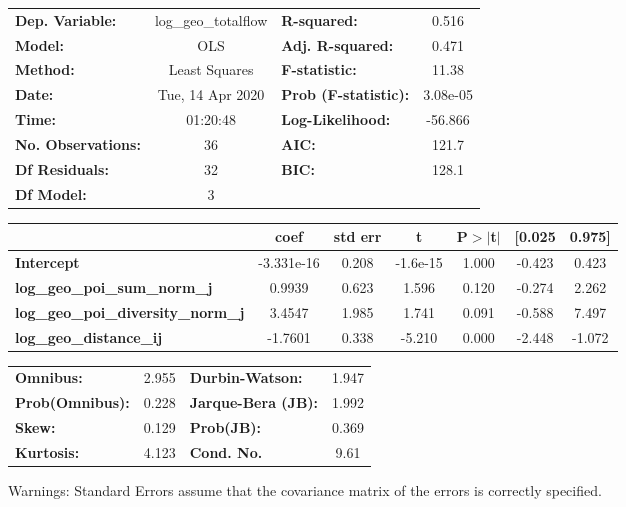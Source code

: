 \begin{center}
\begin{tabular}{lclc}
\toprule
\textbf{Dep. Variable:}                    & log\_geo\_totalflow & \textbf{  R-squared:         } &     0.516   \\
\textbf{Model:}                            &         OLS         & \textbf{  Adj. R-squared:    } &     0.471   \\
\textbf{Method:}                           &    Least Squares    & \textbf{  F-statistic:       } &     11.38   \\
\textbf{Date:}                             &   Tue, 14 Apr 2020  & \textbf{  Prob (F-statistic):} &  3.08e-05   \\
\textbf{Time:}                             &       01:20:48      & \textbf{  Log-Likelihood:    } &   -56.866   \\
\textbf{No. Observations:}                 &            36       & \textbf{  AIC:               } &     121.7   \\
\textbf{Df Residuals:}                     &            32       & \textbf{  BIC:               } &     128.1   \\
\textbf{Df Model:}                         &             3       & \textbf{                     } &             \\
\bottomrule
\end{tabular}
\begin{tabular}{lcccccc}
                                           & \textbf{coef} & \textbf{std err} & \textbf{t} & \textbf{P$> |$t$|$} & \textbf{[0.025} & \textbf{0.975]}  \\
\midrule
\textbf{Intercept}                         &   -3.331e-16  &        0.208     &  -1.6e-15  &         1.000        &       -0.423    &        0.423     \\
\textbf{log\_geo\_poi\_sum\_norm\_j}       &       0.9939  &        0.623     &     1.596  &         0.120        &       -0.274    &        2.262     \\
\textbf{log\_geo\_poi\_diversity\_norm\_j} &       3.4547  &        1.985     &     1.741  &         0.091        &       -0.588    &        7.497     \\
\textbf{log\_geo\_distance\_ij}            &      -1.7601  &        0.338     &    -5.210  &         0.000        &       -2.448    &       -1.072     \\
\bottomrule
\end{tabular}
\begin{tabular}{lclc}
\textbf{Omnibus:}       &  2.955 & \textbf{  Durbin-Watson:     } &    1.947  \\
\textbf{Prob(Omnibus):} &  0.228 & \textbf{  Jarque-Bera (JB):  } &    1.992  \\
\textbf{Skew:}          &  0.129 & \textbf{  Prob(JB):          } &    0.369  \\
\textbf{Kurtosis:}      &  4.123 & \textbf{  Cond. No.          } &     9.61  \\
\bottomrule
\end{tabular}
\end{center}

Warnings: \newline
 [1] Standard Errors assume that the covariance matrix of the errors is correctly specified.